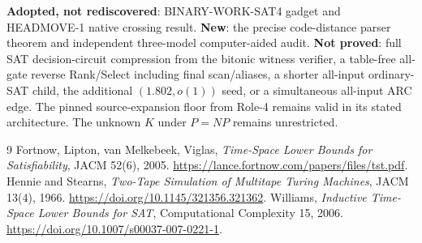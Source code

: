 \documentclass[11pt]{article}
\begin{document}
\noindent \textbf{Adopted, not rediscovered}: BINARY-WORK-SAT4 gadget and HEADMOVE-1 native crossing result. \textbf{New}: the precise code-distance parser theorem and independent three-model computer-aided audit. \textbf{Not proved}: full SAT decision-circuit compression from the bitonic witness verifier, a table-free all-gate reverse Rank/Select including final scan/aliases, a shorter all-input ordinary-SAT child, the additional $(1.802,o(1))$ seed, or a simultaneous all-input ARC edge. The pinned source-expansion floor from Role-4 remains valid in its stated architecture. The unknown $K$ under $P=NP$ remains unrestricted.

\begin{thebibliography}{9}
 Fortnow, Lipton, van Melkebeek, Viglas, \emph{Time-Space Lower Bounds for Satisfiability}, JACM 52(6), 2005. \url{https://lance.fortnow.com/papers/files/tst.pdf}.
 Hennie and Stearns, \emph{Two-Tape Simulation of Multitape Turing Machines}, JACM 13(4), 1966. \url{https://doi.org/10.1145/321356.321362}.
 Williams, \emph{Inductive Time-Space Lower Bounds for SAT}, Computational Complexity 15, 2006. \url{https://doi.org/10.1007/s00037-007-0221-1}.
\end{thebibliography}
\end{document}
